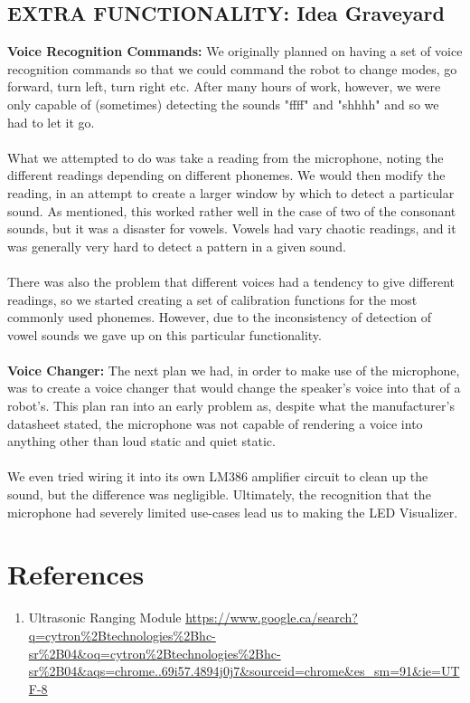 \documentclass[paper=a4, fontsize=11pt]{scrartcl}
\numberwithin{equation}{section}		%
\numberwithin{figure}{section}			%
\numberwithin{table}{section}				%
\begin{document}
{\subsection{EXTRA FUNCTIONALITY: Idea Graveyard}
\textbf{Voice Recognition Commands: } We originally planned on having a set of voice recognition commands so that we could command the robot to change modes, go forward, turn left, turn right etc. After many hours of work, however, we were only capable of (sometimes) detecting the sounds "ffff" and "shhhh" and so we had to let it go.
\\\\
What we attempted to do was take a reading from the microphone, noting the different readings depending on different phonemes. We would then modify the reading, in an attempt to create a larger window by which to detect a particular sound. As mentioned, this worked rather well in the case of two of the consonant sounds, but it was a disaster for vowels. Vowels had vary chaotic readings, and it was generally very hard to detect a pattern in a given sound.
\\\\
There was also the problem that different voices had a tendency to give different readings, so we started creating a set of calibration functions for the most commonly used phonemes. However, due to the inconsistency of detection of vowel sounds we gave up on this particular functionality.
\\\\
\textbf{Voice Changer: }The next plan we had, in order to make use of the microphone, was to create a voice changer that would change the speaker's voice into that of a robot's. This plan ran into an early problem as, despite what the manufacturer's datasheet stated, the microphone was not capable of rendering a voice into anything other than loud static and quiet static.
\\\\
We even tried wiring it into its own LM386 amplifier circuit to clean up the sound, but the difference was negligible. Ultimately, the recognition that the microphone had severely limited use-cases lead us to making the LED Visualizer.
\newpage
\section{References}
\begin{enumerate}


\item Ultrasonic Ranging Module \url{https://www.google.ca/search?q=cytron%2Btechnologies%2Bhc-sr%2B04&oq=cytron%2Btechnologies%2Bhc-sr%2B04&aqs=chrome..69i57.4894j0j7&sourceid=chrome&es_sm=91&ie=UTF-8}


\end{enumerate}}
\end{document}

